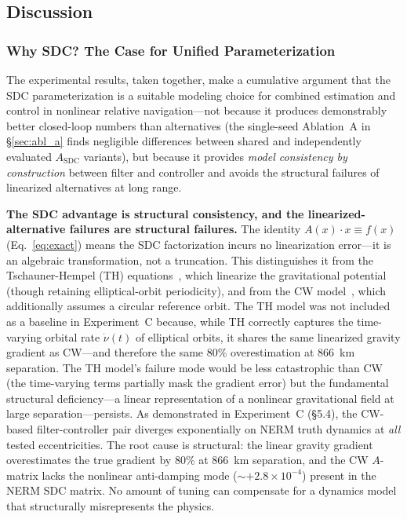 \documentclass[preprint,3p,times]{elsarticle}
\begin{document}
\subsection{Discussion}

\subsubsection{Why SDC? The Case for Unified Parameterization}

The experimental results, taken together, make a cumulative argument that the SDC parameterization is a suitable modeling choice for combined estimation and control in nonlinear relative navigation---not because it produces demonstrably better closed-loop numbers than alternatives (the single-seed Ablation~A in §\ref{sec:abl_a} finds negligible differences between shared and independently evaluated $A_{\text{SDC}}$ variants), but because it provides \emph{model consistency by construction} between filter and controller and avoids the structural failures of linearized alternatives at long range.

\textbf{The SDC advantage is structural consistency, and the linearized-alternative failures are structural failures.} The identity $A(x) \cdot x \equiv f(x)$ (Eq.~\ref{eq:exact}) means the SDC factorization incurs no linearization error---it is an algebraic transformation, not a truncation. This distinguishes it from the Tschauner-Hempel (TH) equations~\cite{Tschauner1965}, which linearize the gravitational potential (though retaining elliptical-orbit periodicity), and from the CW model~\cite{Clohessy1960}, which additionally assumes a circular reference orbit. The TH model was not included as a baseline in Experiment~C because, while TH correctly captures the time-varying orbital rate $\dot{\nu}(t)$ of elliptical orbits, it shares the same linearized gravity gradient as CW---and therefore the same 80\% overestimation at 866~km separation. The TH model's failure mode would be less catastrophic than CW (the time-varying terms partially mask the gradient error) but the fundamental structural deficiency---a linear representation of a nonlinear gravitational field at large separation---persists. As demonstrated in Experiment~C (§5.4), the CW-based filter-controller pair diverges exponentially on NERM truth dynamics at \emph{all} tested eccentricities. The root cause is structural: the linear gravity gradient overestimates the true gradient by 80\% at 866~km separation, and the CW $A$-matrix lacks the nonlinear anti-damping mode (${\sim}{+}2.8 \times 10^{-4}$) present in the NERM SDC matrix. No amount of tuning can compensate for a dynamics model that structurally misrepresents the physics.
\end{document}
